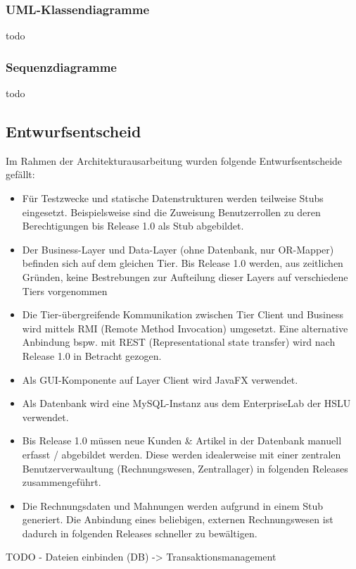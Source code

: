 \subsubsection{UML-Klassendiagramme}
todo


\subsubsection{Sequenzdiagramme}
todo


\subsection{Entwurfsentscheid}
Im Rahmen der Architekturausarbeitung wurden folgende Entwurfsentscheide gefällt:
\begin{itemize}
	\item Für Testzwecke und statische Datenstrukturen werden teilweise Stubs eingesetzt. Beispielsweise sind die Zuweisung Benutzerrollen zu deren Berechtigungen bis Release 1.0 als Stub abgebildet.
	\item Der Business-Layer und Data-Layer (ohne Datenbank, nur OR-Mapper) befinden sich auf dem gleichen Tier. Bis Release 1.0 werden, aus zeitlichen Gründen, keine Bestrebungen zur Aufteilung dieser Layers auf verschiedene Tiers vorgenommen
	\item Die Tier-übergreifende Kommunikation zwischen Tier Client und Business wird mittels RMI (Remote Method Invocation) umgesetzt. Eine alternative Anbindung bspw. mit REST (Representational state transfer) wird nach Release 1.0 in Betracht gezogen.
	\item Als GUI-Komponente auf Layer Client wird JavaFX verwendet.
	\item Als Datenbank wird eine MySQL-Instanz aus dem EnterpriseLab der HSLU verwendet.
	\item Bis Release 1.0 müssen neue Kunden \& Artikel in der Datenbank manuell erfasst / abgebildet werden. Diese werden idealerweise mit einer zentralen Benutzerverwaultung (Rechnungswesen, Zentrallager) in folgenden Releases zusammengeführt.
	\item Die Rechnungsdaten und Mahnungen werden aufgrund in einem Stub generiert. Die Anbindung eines beliebigen, externen Rechnungswesen ist dadurch in folgenden Releases schneller zu bewältigen.
\end{itemize}

TODO
- Dateien einbinden (DB) -> Transaktionsmanagement


